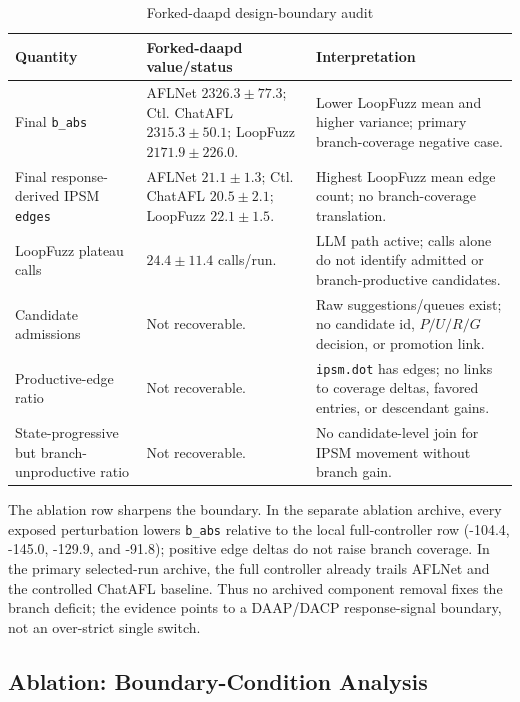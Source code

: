 \documentclass[final,5p,times,number]{elsarticle}
\begin{document}
\begin{table}[!t]
\centering
\caption{Forked-daapd design-boundary audit}
\label{tab:forked_design_boundary}
{\scriptsize
\setlength{\tabcolsep}{3.2pt}
\renewcommand{\arraystretch}{0.95}
\begin{tabularx}{\textwidth}{>{\raggedright\arraybackslash}p{}
                              >{\raggedright\arraybackslash}p{}
                              X}
\toprule
\textbf{Quantity} & \textbf{Forked-daapd value/status} & \textbf{Interpretation} \\
\midrule
Final \texttt{b\_abs} &
AFLNet $2326.3{\pm}77.3$; Ctl. ChatAFL $2315.3{\pm}50.1$; LoopFuzz $2171.9{\pm}226.0$. &
Lower LoopFuzz mean and higher variance; primary branch-coverage negative case. \\
\midrule
Final response-derived IPSM \texttt{edges} &
AFLNet $21.1{\pm}1.3$; Ctl. ChatAFL $20.5{\pm}2.1$; LoopFuzz $22.1{\pm}1.5$. &
Highest LoopFuzz mean edge count; no branch-coverage translation. \\
\midrule
LoopFuzz plateau calls &
$24.4{\pm}11.4$ calls/run. &
LLM path active; calls alone do not identify admitted or branch-productive candidates. \\
\midrule
Candidate admissions &
Not recoverable. &
Raw suggestions/queues exist; no candidate id, $P/U/R/G$ decision, or promotion link. \\
\midrule
Productive-edge ratio &
Not recoverable. &
\texttt{ipsm.dot} has edges; no links to coverage deltas, favored entries, or descendant gains. \\
\midrule
State-progressive but branch-unproductive ratio &
Not recoverable. &
No candidate-level join for IPSM movement without branch gain. \\
\bottomrule
\end{tabularx}
}
\end{table}

The ablation row sharpens the boundary. In the separate ablation archive, every exposed perturbation lowers \texttt{b\_abs} relative to the local full-controller row (-104.4, -145.0, -129.9, and -91.8); positive edge deltas do not raise branch coverage. In the primary selected-run archive, the full controller already trails AFLNet and the controlled ChatAFL baseline. Thus no archived component removal fixes the branch deficit; the evidence points to a DAAP/DACP response-signal boundary, not an over-strict single switch.

\subsection{Ablation: Boundary-Condition Analysis}
\end{document}
